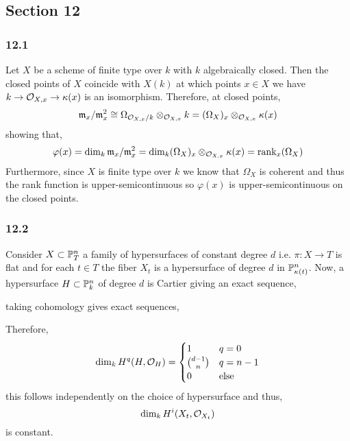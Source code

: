 \documentclass[12pt]{article}
\begin{document}
\subsection{Section 12}

\subsubsection{12.1}

Let $X$ be a scheme of finite type over $k$ with $k$ algebraically closed. Then the closed points of $X$ coincide with $X(k)$ at which points $x \in X$ we have $k \to \stalk{X}{x} \to \kappa(x)$ is an isomorphism. Therefore, at closed points,
\[ \m_x / \m_x^2 \cong \Omega_{\stalk{X}{x}/k} \otimes_{\stalk{X}{x}} k = (\Omega_X)_x \otimes_{\stalk{X}{x}} \kappa(x) \]
showing that,
\[ \varphi(x) = \dim_k \m_x / \m_x^2 = \dim_k(\Omega_X)_x \otimes_{\stalk{X}{x}} \kappa(x) = \rank_x{(\Omega_X)} \]
Furthermore, since $X$ is finite type over $k$ we know that $\Omega_X$ is coherent and thus the rank function is upper-semicontinuous so $\varphi(x)$ is upper-semicontinuous on the closed points.

\subsubsection{12.2}

Consider $X \subset \P^n_T$ a family of hypersurfaces of constant degree $d$ i.e. $\pi : X \to T$ is flat and for each $t \in T$ the fiber $X_t$ is a hypersurface of degree $d$ in $\P^n_{\kappa(t)}$. Now, a hypersurface $H \subset \P^n_k$ of degree $d$ is Cartier giving an exact sequence,
\begin{center}
\end{center}
taking cohomology gives exact sequences,
\begin{center}
\end{center}
Therefore,
\[ \dim_k H^{q}(H, \struct{H}) = \begin{cases}
1 & q = 0
\\
{d - 1 \choose n } & q = n-1
\\
0 & \text{else}
\end{cases} \] 
this follows independently on the choice of hypersurface and thus,
\[ \dim_k H^i(X_t, \struct{X_t}) \]
is constant.
\end{document}
